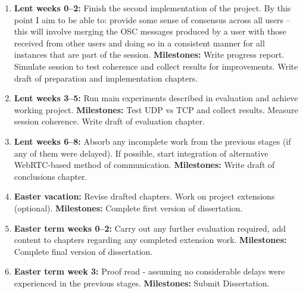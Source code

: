 \documentclass[12pt,a4paper,twoside]{article}
\begin{document}
\begin{enumerate}
\item \textbf{Lent weeks 0--2:} Finish the second implementation of the project. By this point I aim to be able to: provide some sense of consensus across all users -- this will involve merging the OSC messages produced by a user with those received from other users and doing so in a consistent manner for all instances that are part of the session.
\newline\textbf{Milestones:} Write progress report. Simulate session to test coherence and collect results for improvements. Write draft of preparation and implementation chapters.

\item \textbf{Lent weeks 3--5:} Run main experiments described in evaluation and achieve working project.
\newline\textbf{Milestones:} Test UDP vs TCP and collect results. Measure session coherence. Write draft of evaluation chapter.

\item \textbf{Lent weeks 6--8:} Absorb any incomplete work from the previous stages (if any of them were delayed). If possible, start integration of alternative WebRTC-based method of communication.
\newline\textbf{Milestones:} Write draft of conclusions chapter.

\item \textbf{Easter vacation:} Revise drafted chapters. Work on project extensions (optional).
\newline\textbf{Milestones:} Complete first version of dissertation.

\item \textbf{Easter term weeks 0--2:}  Carry out any further evaluation required, add content to chapters regarding any completed extension work.
\newline\textbf{Milestones:} Complete final version of dissertation.

\item \textbf{Easter term week 3:} Proof read - assuming no considerable delays were experienced in the previous stages.
\newline\textbf{Milestones:} Submit Dissertation.

\end{enumerate}
\end{document}
